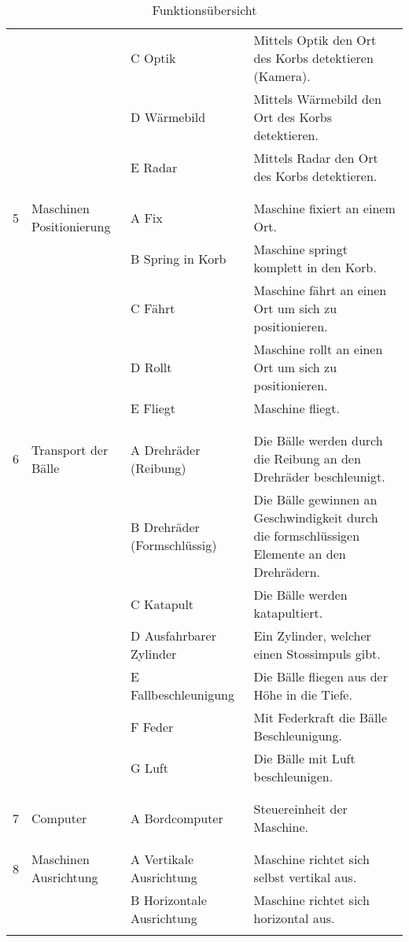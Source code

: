 \begin{longtable}{l p{4cm} p{4.5cm} p{7cm}}
	 &  & C Optik & Mittels Optik den Ort des Korbs detektieren (Kamera). \\
	 &  & D Wärmebild & Mittels Wärmebild den Ort des Korbs detektieren. \\
	 &  & E Radar & Mittels Radar den Ort des Korbs detektieren. \\ \\
	\hline \\
	5 & Maschinen Positionierung & A Fix & Maschine fixiert an einem Ort. \\
	 &  & B Spring in Korb & Maschine springt komplett in den Korb. \\
	 &  & C Fährt & Maschine fährt an einen Ort um sich zu positionieren. \\
	 &  & D Rollt & Maschine rollt an einen Ort um sich zu positionieren. \\
	 &  & E Fliegt & Maschine fliegt. \\ \\
	\hline \\
	6 & Transport der Bälle & A Drehräder (Reibung) & Die Bälle werden durch die Reibung an den Drehräder beschleunigt. \\
	 &  & B Drehräder (Formschlüssig) & Die Bälle gewinnen an Geschwindigkeit durch die formschlüssigen Elemente an den Drehrädern.  \\
	 &  & C Katapult & Die Bälle werden katapultiert. \\
	 &  & D Ausfahrbarer Zylinder & Ein Zylinder, welcher einen Stossimpuls gibt.  \\
	 &  & E Fallbeschleunigung & Die Bälle fliegen aus der Höhe in die Tiefe. \\
	 &  & F Feder & Mit Federkraft die Bälle Beschleunigung.  \\
	 &  & G Luft & Die Bälle mit Luft beschleunigen.  \\ \\
	\hline \\ 
	7 & Computer & A Bordcomputer & Steuereinheit der Maschine. \\ \\
	\hline \\
	8 & Maschinen Ausrichtung & A Vertikale Ausrichtung & Maschine richtet sich selbst vertikal aus. \\
	 &  & B Horizontale Ausrichtung & Maschine richtet sich horizontal aus. \\
 	\caption{Funktionsübersicht}
 	\label{tab:quelle}
\end{longtable}

